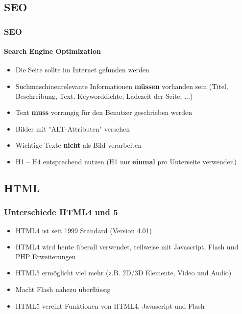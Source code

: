 \documentclass[xcolor=dvipsnames]{beamer}
\begin{document}
\subsection{SEO}
\begin{frame} %
  \frametitle{SEO} %
  \framesubtitle{Search Engine Optimization} %
  \begin{block}{}
	\begin{itemize}
		\item Die Seite sollte im Internet gefunden werden
	\end{itemize}
  \end{block}
  \begin{alertblock}{}
	\begin{itemize}
		\item Suchmaschinenrelevante Informationen \textbf{müssen} vorhanden sein (Titel, Beschreibung, Text, Keyworddichte, Ladezeit der Seite, ...)
		\item Text \textbf{muss} vorrangig für den Benutzer geschrieben werden
		\item Bilder mit "ALT-Attributen" versehen
		\item Wichtige Texte \textbf{nicht} als Bild verarbeiten
		\item H1 – H4 entsprechend nutzen (H1 nur \textbf{einmal} pro Unterseite verwenden)
	\end{itemize}
  \end{alertblock}
\end{frame}


\subsection{HTML}
\begin{frame} %
  \frametitle{Unterschiede HTML4 und 5} %
  \begin{block}{}
	\begin{itemize}
		\item HTML4 ist seit 1999 Standard (Version 4.01)
		\item HTML4 wird heute überall verwendet, teilweise mit Javascript, Flash und PHP Erweiterungen
		\item HTML5 ermöglicht viel mehr (z.B. 2D/3D Elemente, Video und Audio)
		\item Macht Flash nahezu überflüssig
		\item HTML5 vereint Funktionen von HTML4, Javascript und Flash
	\end{itemize}
  \end{block}
\end{frame}
\end{document}
